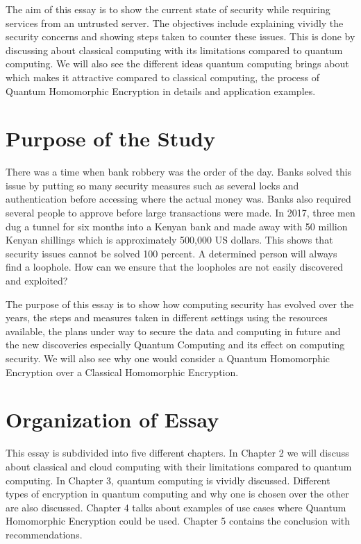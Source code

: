 The aim of this essay is to show the current state of security while requiring services from an untrusted server. The objectives include explaining vividly the security concerns and showing steps taken to counter these issues. This is done by discussing about classical computing with its limitations compared to quantum computing. We will also see the different ideas quantum computing brings about which makes it attractive compared to classical computing, the process of Quantum Homomorphic Encryption in details and application examples.

\section{Purpose of the Study}
There was a time when bank robbery was the order of the day. Banks solved this issue by putting so many security measures such as several locks and authentication before accessing where the actual money was. Banks also required several people to approve before large transactions were made. In 2017, three men dug a tunnel for six months into a Kenyan bank and made away with 50 million Kenyan shillings which is approximately 500,000 US dollars. This shows that security issues cannot be solved 100 percent. A determined person will always find a loophole. How can we ensure that the loopholes are not easily discovered and exploited?

The purpose of this essay is to show how computing security has evolved over the years, the steps and measures taken in different settings using the resources available, the plans under way to secure the data and computing in future and the new discoveries especially Quantum Computing and its effect on computing security. We will also see why one would consider a Quantum Homomorphic Encryption over a Classical Homomorphic Encryption. 

\section{Organization of Essay}

This essay is subdivided into five different chapters. In Chapter 2 we will discuss about classical and cloud computing with their limitations compared to quantum computing. In Chapter 3, quantum computing is vividly discussed. Different types of encryption in quantum computing and why one is chosen over the other are also discussed. Chapter 4 talks about examples of use cases where Quantum Homomorphic Encryption could be used. Chapter 5 contains the conclusion with recommendations.

